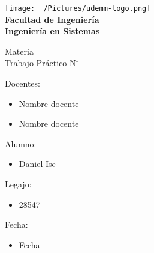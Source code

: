 \documentclass[12pt]{article}
\begin{document}
\thispagestyle{empty}

\begin{center}
	\vspace*{.5cm}
	\texttt{[image: ~/Pictures/udemm-logo.png]}\\
	\vspace{.2cm}
	\Large
	\textbf{Facultad de Ingeniería}\\
	\textbf{Ingeniería en Sistemas}\\
	\vspace{2cm}

	\Huge
	Materia\\
	Trabajo Práctico N\(^\circ\) \\
	\vfill

	\raggedright
	\Large
	Docentes:
	\begin{itemize}
		\item[] Nombre docente \\
		\item[] Nombre docente \\
	\end{itemize}
	Alumno:
	\begin{itemize}
		\item[] Daniel Ise
	\end{itemize}
	Legajo:
	\begin{itemize}
		\item[] 28547
	\end{itemize}
	Fecha:
	\begin{itemize}
		\item[] Fecha
	\end{itemize}
\end{center}

\pagebreak
\end{document}
